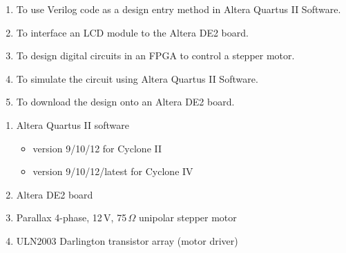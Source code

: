 
\begin{objectives}
  \begin{enumerate}
    \item To use Verilog code as a design entry method in Altera Quartus II Software.
    \item To interface an LCD module to the Altera DE2 board.
    \item To design digital circuits in an FPGA to control a stepper motor.
    \item To simulate the circuit using Altera Quartus II Software.
    \item To download the design onto an Altera DE2 board.
  \end{enumerate}
\end{objectives}

\begin{equipment}
  \begin{enumerate}
    \item Altera Quartus II software
          \begin{itemize}
            \item version 9/10/12 for Cyclone II
            \item version 9/10/12/latest for Cyclone IV
          \end{itemize}
    \item Altera DE2 board
    \item Parallax 4-phase, 12\,V, 75\,$\Omega$ unipolar stepper motor
    \item ULN2003 Darlington transistor array (motor driver)
  \end{enumerate}
\end{equipment}

